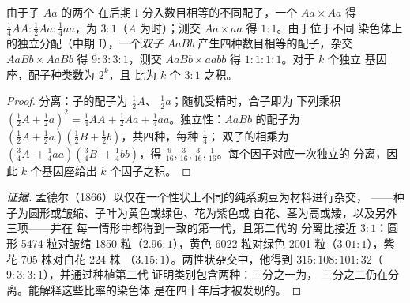 \begin{theorem}[孟德尔比率]\label{thm:b2:meiosis-heredity:mendel}
由于子 $Aa$ 的两个
在后期 I 分入数目相等的不同配子，一个\emph{}
$Aa \times Aa$ 得 $\tfrac14 AA : \tfrac12 Aa :
\tfrac14 aa$，为 $3 : 1$（$A$ 为时）；测交
$Aa \times aa$ 得 $1 : 1$。由于位于不同
染色体上的独立分配（中期 I），一个\emph{双子}
$AaBb$ 产生四种数目相等的配子，杂交
$AaBb \times AaBb$ 得 $9 : 3 : 3 : 1$，测交
$AaBb \times aabb$ 得 $1 : 1 : 1 : 1$。对于 $k$ 个独立
基因座，配子种类数为 $2^k$，且
比为 $k$ 个 $3 : 1$ 之积。
\end{theorem}
\begin{proof}
分离：子的配子为 $\tfrac12 A$、
$\tfrac12 a$；随机受精时，合子即为
下列乘积 $(\tfrac12 A + \tfrac12 a)^2 = \tfrac14 AA + \tfrac12 Aa +
\tfrac14 aa$。独立性：$AaBb$ 的配子为 $(\tfrac12 A
+ \tfrac12 a)(\tfrac12 B + \tfrac12 b)$，共四种，每种 $\tfrac14$；
双子的相乘为 $(\tfrac34 A\_ + \tfrac14 aa)
(\tfrac34 B\_ + \tfrac14 bb)$，得 $\tfrac{9}{16}, \tfrac{3}{16},
\tfrac{3}{16}, \tfrac{1}{16}$。每个因子对应一次独立的
分离，因此 $k$ 个基因座给出 $k$ 个因子之积。
\end{proof}
\begin{proof}[证据]
孟德尔（1866）以仅在一个性状上不同的纯系豌豆为材料进行杂交，
——种子为圆形或皱缩、子叶为黄色或绿色、花为紫色或
白花、茎为高或矮，以及另外三项——并在
每一情形中都得到一致的第一代，且第二代的
分离比接近 $3 : 1$：圆形 5474 粒对皱缩 1850 粒（$2.96 :
1$），黄色 6022 粒对绿色 2001 粒（$3.01 : 1$），紫花 705 株对白花 224 株
（$3.15 : 1$）。两性状杂交中，他得到 $315 : 108 : 101 :
32$（$9 : 3 : 3 : 1$），并通过种植第二代
证明类别包含两种：三分之一为，
三分之二仍在分离。能解释这些比率的染色体
是在四十年后才被发现的。
\end{proof}

